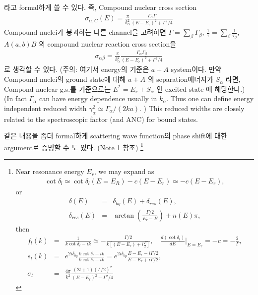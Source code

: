 \documentclass[11pt]{book}
\newcommand{\bea}{\begin{eqnarray}}
\newcommand{\eea}{\end{eqnarray}}
\newcommand{\no}{\nonumber \\}
\begin{document}
라고 formal하게 쓸 수 있다. 즉, Compound nuclear cross section
\bea 
\sigma_{\alpha,C}(E)=\frac{\pi}{k_\alpha^2}\frac{\Gamma_\alpha\Gamma}{(E-E_r)^2+\Gamma^2/4}
\eea 
Compound nuclei가 붕괴하는 다른 channel을 고려하면 $\Gamma=\sum_{\beta}\Gamma_\beta$, 
$\frac{1}{\tau}=\sum_{\beta}\frac{1}{\tau_\beta}$, $A(a,b)B$ 의 compound nuclear reaction cross section을 
\bea 
\sigma_{\alpha\beta}= \frac{\pi}{k_\alpha^2}\frac{\Gamma_\alpha\Gamma_\beta}{(E-E_r)^2+\Gamma^2/4}
\eea 
로 생각할 수 있다. (주의: 여기서 energy의 기준은 $a+A$ system이다.
만약 Compound nuclei의 ground state에 대해 $a+A$ 의 separation에너지가 $S_\alpha$ 라면,
Compond nuclear g.s.를 기준으로는 $E^*=E_r+S_\alpha$ 인 excited state 에 해당한다.)
(In fact $\Gamma_\alpha$ can have energy dependence usually in $k_\alpha$.
Thus one can define energy independent reduced width $\gamma_\alpha^2\simeq \Gamma_\alpha/(2k a)$.
) This reduced widths are closely related to the spectroscopic factor (and ANC) for bound states. 


같은 내용을 좀더 formal하게 scattering wave function의 phase shift에 대한 argument로 증명할 수 도 있다. 
(Note 1 참조)
\footnote{ 
Near resonance energy $E_r$, we may expand as
\bea 
\cot\delta_l \simeq \cot\delta_l(E=E_R)-c(E-E_r)\simeq -c(E-E_r),
\eea 
or
\bea 
\delta(E)&=&\delta_{bg}(E)+\delta_{res}(E),\no 
\delta_{res}(E)&=&\arctan(\frac{\Gamma/2}{E_r-E})+n(E)\pi, 
\eea 
then
\bea 
f_l(k)&=&\frac{1}{k\cot\delta_l-ik}\simeq -\frac{\Gamma/2}{k\left[(E-E_r)+i\frac{\Gamma}{2}\right] },
\quad \frac{d(\cot\delta_l)}{dE}|_{E=E_r}=-c=-\frac{2}{\Gamma},\no 
s_l(k)&=&e^{2i\delta_{bg}}\frac{k\cot\delta_l+ik}{k\cot\delta_l-ik}
=e^{2i\delta_{bg}}\frac{E-E_r-i\Gamma/2}{E-E_r+i\Gamma/2} ,\no 
\sigma_l&=&\frac{4\pi}{k^2}\frac{(2l+1)(\Gamma/2)^2}{(E-E_r)^2+\Gamma^2/4}
\eea 
}
\end{document}
